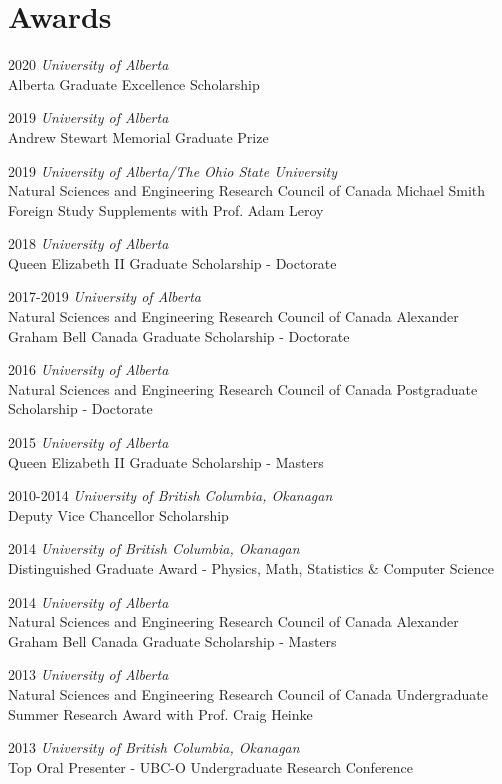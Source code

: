 \documentclass[letterpaper,11pt]{article}
\newlength{\mainindent} \setlength{\mainindent}{12pt}
\newlength{\contentindent} \setlength{\contentindent}{19ex}
\newenvironment{datelist}{
  \begingroup
  \raggedright
  \begin{description}[labelindent=\mainindent,leftmargin=\contentindent,
      style=sameline,font=\normalfont,topsep=0pt,partopsep=0pt,parsep=0pt,
      itemsep=4pt]
}{
  \end{description}
  \endgroup
}
\begin{document}
\section*{Awards}
\begin{datelist}
\item[2020] \emph{University of Alberta} \\ Alberta Graduate Excellence Scholarship
\item[2019] \emph{University of Alberta} \\ Andrew Stewart Memorial Graduate Prize
\item[2019] \emph{University of Alberta/The Ohio State University} \\ Natural Sciences and Engineering Research Council of Canada Michael Smith Foreign Study Supplements with Prof. Adam Leroy
\item[2018] \emph{University of Alberta} \\ Queen Elizabeth II Graduate Scholarship - Doctorate
\item[2017-2019] \emph{University of Alberta} \\ Natural Sciences and Engineering Research Council of Canada Alexander Graham Bell Canada Graduate Scholarship - Doctorate
\item[2016] \emph{University of Alberta} \\ Natural Sciences and Engineering Research Council of Canada Postgraduate Scholarship - Doctorate
\item[2015] \emph{University of Alberta} \\ Queen Elizabeth II Graduate Scholarship - Masters
\item[2010-2014] \emph{University of British Columbia, Okanagan} \\ Deputy Vice Chancellor Scholarship
\item[2014] \emph{University of British Columbia, Okanagan} \\ Distinguished Graduate Award - Physics, Math, Statistics \& Computer Science
\item[2014] \emph{University of Alberta} \\ Natural Sciences and Engineering Research Council of Canada Alexander Graham Bell Canada Graduate Scholarship - Masters
\item[2013] \emph{University of Alberta} \\ Natural Sciences and Engineering Research Council of Canada Undergraduate Summer Research Award with Prof. Craig Heinke
\item[2013] \emph{University of British Columbia, Okanagan} \\ Top Oral Presenter - UBC-O Undergraduate Research Conference

\end{datelist}
\end{document}
